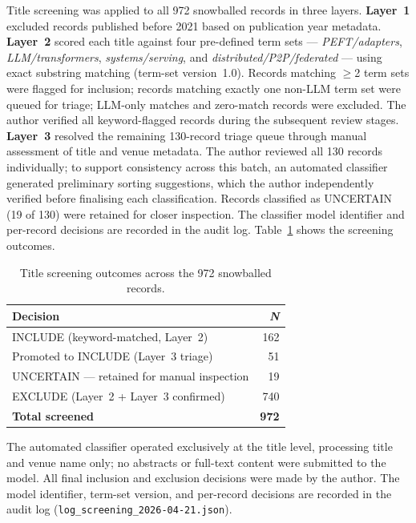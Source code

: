 Title screening was applied to all 972 snowballed records in three layers.
\textbf{Layer~1} excluded records published before 2021 based on publication year metadata.
\textbf{Layer~2} scored each title against four pre-defined term sets --- \textit{PEFT/adapters},
\textit{LLM/transformers}, \textit{systems/serving}, and
\textit{distributed/P2P/federated} --- using exact substring matching (term-set version~1.0).
Records matching $\geq$2 term sets were flagged for inclusion; records matching exactly one
non-LLM term set were queued for triage; LLM-only matches and zero-match records were
excluded. The author verified all keyword-flagged records during the subsequent review stages.
\textbf{Layer~3} resolved the remaining 130-record triage queue through manual assessment
of title and venue metadata. The author reviewed all 130 records individually; to support
consistency across this batch, an automated classifier generated preliminary sorting
suggestions, which the author independently verified before finalising each classification.
Records classified as UNCERTAIN (19 of 130) were retained for closer inspection. The
classifier model identifier and per-record decisions are recorded in the audit log.
Table~\ref{tab:screening} shows the screening outcomes.

\begin{table}[H]
\centering
\caption{Title screening outcomes across the 972 snowballed records.}
\label{tab:screening}
\begin{tabular}{lr}
\toprule
\textbf{Decision} & \textbf{\textit{N}} \\
\midrule
INCLUDE (keyword-matched, Layer~2)     & 162 \\
Promoted to INCLUDE (Layer~3 triage)  &  51 \\
UNCERTAIN --- retained for manual inspection &  19 \\
EXCLUDE (Layer~2 + Layer~3 confirmed)  & 740 \\
\midrule
\textbf{Total screened}                & \textbf{972} \\
\bottomrule
\end{tabular}
\end{table}

The automated classifier operated exclusively at the title level, processing 
title and venue name only; no abstracts or full-text content were submitted 
to the model. All final inclusion and exclusion decisions were made by the author. 
The model identifier, term-set version, and per-record decisions are recorded 
in the audit log (\texttt{log\_screening\_2026-04-21.json}).

